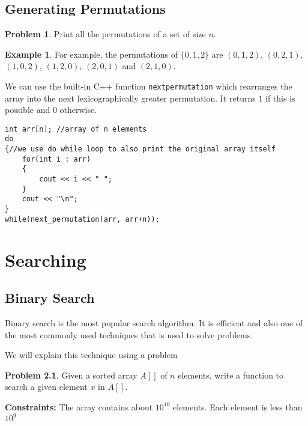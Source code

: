 \documentclass[twoside,12pt,a4paper,english]{book}
\theoremstyle{definition}
\newtheorem*{exmp}{Example}
\theoremstyle{problemstyle}
\newtheorem*{problem}{Problem} %
\theoremstyle{problemstyle}
\theoremstyle{problemstyle}
\begin{document}
\section{Generating Permutations}
\begin{problem}
Print all the permutations of a set of size $n$.
\end{problem}
\begin{exmp}
For example, the permutations of $\{0,1,2\}$ are
$(0,1,2)$, $(0,2,1)$, $(1,0,2)$, $(1,2,0)$,
$(2,0,1)$ and $(2,1,0)$.
\end{exmp}
\begin{tcolorbox}[title=Solution]

We can use the built-in C++ function \texttt{next\textunderscore permutation} which rearranges the array into the next lexicographically greater permutation. It returns $1$ if this is possible and $0$ otherwise.

\begin{lstlisting}
int arr[n]; //array of n elements
do
{//we use do while loop to also print the original array itself
    for(int i : arr)
    {
        cout << i << " ";
    }
    cout << "\n";
}
while(next_permutation(arr, arr+n));
\end{lstlisting}

\end{tcolorbox}


\chapter{Searching}

\section{Binary Search}

Binary search is the most popular search algorithm. It is efficient and also one of the most commonly used techniques that is used to solve problems.

We will explain this technique using a problem

\begin{problem}
Given a sorted array $A[]$ of $n$ elements, write a function to search a given element $x$ in $A[]$.
\end{problem}

\textbf{Constraints:} The array contains about $10^{10}$ elements. Each element is less than $10^9$
\end{document}
